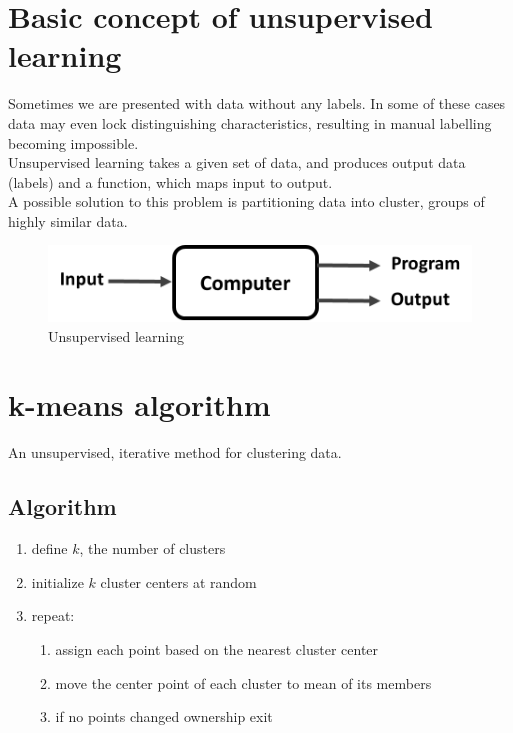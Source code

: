 \documentclass[a4paper,12pt,answers]{article}
\begin{document}
	
	
	\newpage
	\section{Basic concept of unsupervised learning}
	Sometimes we are presented with data without any labels. In some of these cases data may even lock distinguishing characteristics, resulting in manual labelling becoming impossible.
	\noindent
	\\[4pt]
	Unsupervised learning takes a given set of data, and produces output data (labels) and a function, which maps input to output.
	\noindent
	\\[4pt]
	A possible solution to this problem is partitioning data into cluster, groups of highly similar data.
	
	\begin{figure}[H]
		\centering
		\includegraphics[width=0.7\linewidth]{unsupervised_learning}
		\caption{Unsupervised learning}
		\label{fig:unsupervisedlearning}
	\end{figure}
	
	
	
	\section{k-means algorithm}
	An unsupervised, iterative method for clustering data.
	
	\subsection{Algorithm}
	\begin{enumerate}
		\item define $k$, the number of clusters
		\item initialize $k$ cluster centers at random
		\item repeat:
		\begin{enumerate}
			\item assign each point based on the nearest cluster center
			\item move the center point of each cluster to mean of its members
			\item if no points changed ownership exit
		\end{enumerate}
	\end{enumerate}
	
\end{document}
